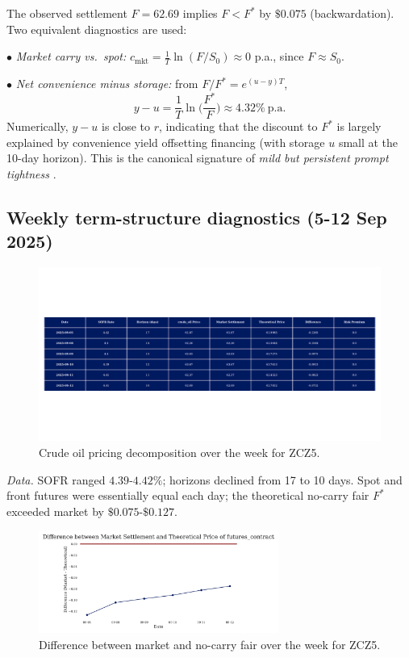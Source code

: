 \documentclass[11pt,a4paper]{article} %
\begin{document}
The observed settlement \(F={62.69}\) implies \(F<F^{*}\) by \(\$0.075\) (backwardation). Two equivalent diagnostics are used:

\(\bullet\) \emph{Market carry vs.\ spot:} \(c_{\text{mkt}}=\frac{1}{T}\ln(F/S_0)\approx 0\) p.a., since \(F\approx S_0\).

\(\bullet\) \emph{Net convenience minus storage:} from \(F/F^{*}=e^{(u-y)T}\),
\[
y-u=\frac{1}{T}\ln\!\Big(\frac{F^{*}}{F}\Big)\approx {4.32\%}\ \text{p.a.}
\]
Numerically, \(y-u\) is close to \(r\), indicating that the discount to \(F^{*}\) is largely explained by convenience yield offsetting financing (with storage \(u\) small at the 10-day horizon). This is the canonical signature of \emph{mild but persistent prompt tightness} \citep{eia_backwardation_2013,milonas_convenience_2024}.

\subsection{Weekly term-structure diagnostics (5-12 Sep 2025)}

\begin{figure}[h]
  \centering
  \includegraphics[width=1\textwidth]{figures/crude_oil_pricing_over_the_week.pdf}
  \caption{Crude oil pricing decomposition over the week for ZCZ5.}
\end{figure}

\textit{Data.} SOFR ranged \(4.39\)-\(4.42\%\); horizons declined from 17 to 10 days. Spot and front futures were essentially equal each day; the theoretical no-carry fair \(F^{*}\) exceeded market by \(\$0.075\)-\(\$0.127\).

\begin{figure}[h]
  \centering
  \includegraphics[width=0.7\textwidth]{figures/crude_oil_difference.pdf}
  \caption{Difference between market and no-carry fair over the week for ZCZ5.}
\end{figure}
\end{document}
